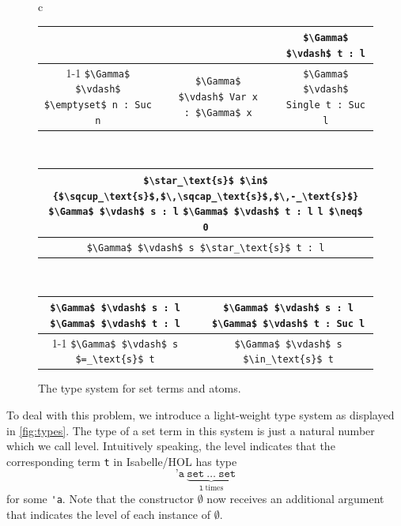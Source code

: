 \documentclass[runningheads]{llncs}
\newcommand{\unionS}{\sqcup_\text{s}}
\newcommand{\interS}{\sqcap_\text{s}}
\newcommand{\diffS}{-_\text{s}}
\newcommand{\inS}{\in_\text{s}}
\newcommand{\eqS}{=_\text{s}}
\begin{document}
\begin{figure}[t]
  \centering
  \begin{tabular}{c}
    \begin{tabular}{ccccc}
      &\qquad\quad&&\qquad\quad& \lstinline!$\Gamma$ $\vdash$ t : l! \\
      \cmidrule{1-1}\cmidrule{3-3}\cmidrule{5-5}
      \lstinline!$\Gamma$ $\vdash$ $\emptyset$ n : Suc n! & &
      \lstinline!$\Gamma$ $\vdash$ Var x : $\Gamma$ x! & &
      \lstinline!$\Gamma$ $\vdash$ Single t : Suc l! \\
    \end{tabular}
    \\[2em]
    \begin{tabular}{c}
      \lstinline!$\star_\text{s}$ $\in$ {$\unionS$,$\,\interS$,$\,\diffS$}! \quad
      \lstinline!$\Gamma$ $\vdash$ s : l! \quad
      \lstinline!$\Gamma$ $\vdash$ t : l! \quad 
      \lstinline!l $\neq$ 0! \\
      \midrule
      \lstinline!$\Gamma$ $\vdash$ s $\star_\text{s}$ t : l! \\
    \end{tabular}
    \\[2.5em]
    \begin{tabular}{ccc}
      \lstinline!$\Gamma$ $\vdash$ s : l! \quad \lstinline!$\Gamma$ $\vdash$ t : l! &\qquad\quad&
      \lstinline!$\Gamma$ $\vdash$ s : l! \quad \lstinline!$\Gamma$ $\vdash$ t : Suc l!
      \\
      \cmidrule{1-1}\cmidrule{3-3}
      \lstinline!$\Gamma$ $\vdash$ s $\eqS$ t! && \lstinline!$\Gamma$ $\vdash$ s $\inS$ t! \\
    \end{tabular}
  \end{tabular}
  \caption{The type system for set terms and atoms.\label{fig:types}}
\end{figure}

To deal with this problem, we introduce a light-weight type system as displayed in \autoref{fig:types}. 
The type of a set term in this system is just a natural number which we call level.
Intuitively speaking, the level indicates that the corresponding term \lstinline!t! in Isabelle/HOL has type
\[
  \texttt{'a}\ \underbrace{\texttt{set}\ \ldots\ \texttt{set}}_{\texttt{l}\ \text{times}}
\]
for some \lstinline!'a!.
Note that the constructor $\emptyset$ now receives an additional argument that indicates the level of each instance of $\emptyset$.
\end{document}
